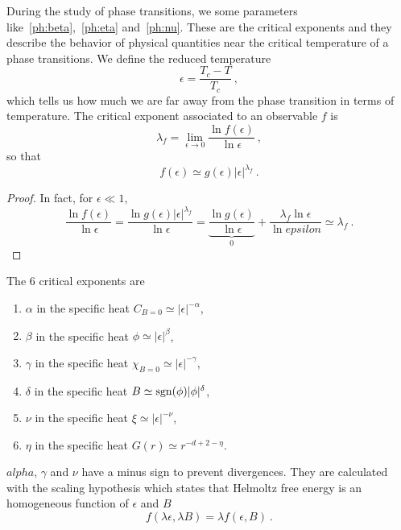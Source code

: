     During the study of phase transitions, we some parameters like~\eqref{ph:beta},~\eqref{ph:eta} and~\eqref{ph:nu}. These are the critical exponents and they describe the behavior of physical quantities near the critical temperature of a phase transitions. We define the reduced temperature 
    \begin{equation*}
        \epsilon = \frac{T_c - T}{T_c} ~,
    \end{equation*}
    which tells us how much we are far away from the phase transition in terms of temperature. The critical exponent associated to an observable $f$ is 
    \begin{equation*}
        \lambda_f = \lim_{\epsilon \rightarrow 0} \frac{\ln f(\epsilon)}{\ln \epsilon} ~,
    \end{equation*}
    so that 
    \begin{equation*}
        f (\epsilon) \simeq g(\epsilon) |\epsilon|^{\lambda_f} ~.
    \end{equation*}
    \begin{proof}
        In fact, for $\epsilon \ll 1$,
        \begin{equation*}
            \frac{\ln f(\epsilon)}{\ln \epsilon} = \frac{\ln g(\epsilon) |\epsilon|^{\lambda_f}}{\ln \epsilon} = \underbrace{\frac{\ln g(\epsilon)}{\ln \epsilon}}_0 + \frac{\lambda_f \ln \epsilon}{\ln epsilon} \simeq \lambda_f ~.
        \end{equation*}
    \end{proof}
    
    The $6$ critical exponents are
    \begin{enumerate}
        \item $\alpha$ in the specific heat $C_{B = 0} \simeq |\epsilon|^{-\alpha}$,
        \item $\beta$ in the specific heat $\phi \simeq |\epsilon|^{\beta}$,
        \item $\gamma$ in the specific heat $\chi_{B = 0} \simeq |\epsilon|^{-\gamma}$,
        \item $\delta$ in the specific heat $B \simeq \operatorname{sgn}(\phi) |\phi|^{\delta}$,
        \item $\nu$ in the specific heat $\xi \simeq |\epsilon|^{-\nu}$,
        \item $\eta$ in the specific heat $G(r) \simeq r^{-d+2-\eta}$.
    \end{enumerate}
    $alpha$, $\gamma$ and $\nu$ have a minus sign to prevent divergences. They are calculated with the scaling hypothesis which states that Helmoltz free energy is an homogeneous function of $\epsilon$ and $B$ 
    \begin{equation*}
        f ( \lambda \epsilon, \lambda B) = \lambda f(\epsilon, B) ~.
    \end{equation*}

